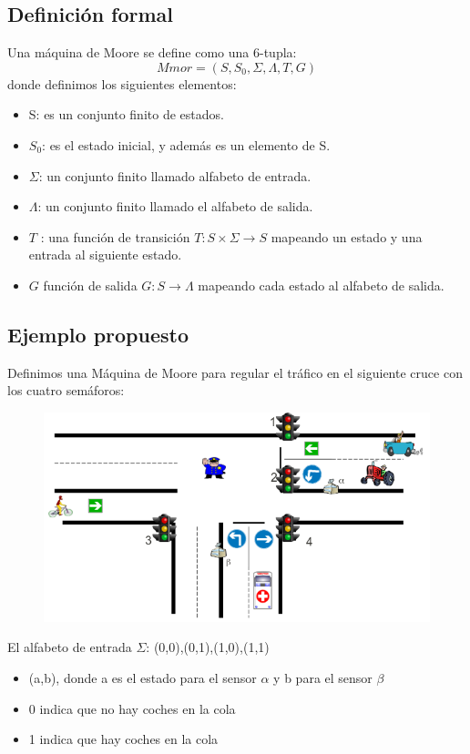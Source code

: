 \documentclass[12pt,a4paper]{article}
\begin{document}
	\subsection{Definición formal}
	Una máquina de Moore se define como una 6-tupla:
	\[ Mmor = (S,S_{0},\Sigma,\Lambda,T,G)  \]
	donde definimos los siguientes elementos:
	\begin{itemize}
		\item S: es un conjunto finito de estados.
		\item $S_{0}$: es el estado inicial, y además es un elemento de S.
		\item $\Sigma$: un conjunto finito llamado alfabeto de entrada.
		\item $\Lambda$: un conjunto finito llamado el alfabeto de salida.
		\item $T$ : una función de transición $T: S \times \Sigma \rightarrow S$ mapeando un estado y una entrada al siguiente estado.
		\item $G$ función de salida $G : S \rightarrow \Lambda $ mapeando cada estado al alfabeto de salida.
	\end{itemize}
	\clearpage

	
	\newpage
	\subsection{Ejemplo propuesto}
	Definimos una Máquina de Moore para regular el tráfico en el siguiente cruce con los cuatro semáforos:
		
	\begin{figure}[h]
		\centering
		\includegraphics[width=0.4
		\linewidth]{img/4}
		\caption{}
		\label{fig:4}
	\end{figure}

El alfabeto de entrada $\Sigma$: {(0,0),(0,1),(1,0),(1,1)}

	\begin{itemize}
		\item (a,b), donde a es el estado para el sensor $\alpha$ y b para el sensor $\beta$
		\item 0 indica que no hay coches en la cola
		\item 1 indica que hay coches en la cola
	\end{itemize}
\end{document}
